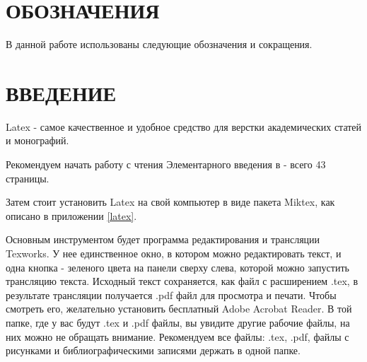 \documentclass[a4paper,14pt,oneside]{book}
\theoremstyle{plain} %
\theoremstyle{definition} %
\theoremstyle{remark} %
\begin{document}




\cleardoublepage               %

\renewcommand\contentsname{Содержание}
\tableofcontents

\cleardoublepage                    %

\setcounter{page}{4}  %

\chapter*{ОБОЗНАЧЕНИЯ}

В данной работе использованы следующие обозначения и сокращения.

\chapter*{ВВЕДЕНИЕ}

 Latex - самое качественное и удобное средство для верстки академических статей и монографий.

Рекомендуем начать работу с чтения Элементарного введения в \cite{__2003} - всего 43 страницы.

Затем стоит установить Latex на свой компьютер  в виде пакета Miktex, как описано в приложении \ref{latex}. 

Основным инструментом будет программа редактирования и трансляции Texworks. У нее единственное окно, в котором можно редактировать текст, и одна кнопка - зеленого цвета на панели сверху слева, которой можно запустить трансляцию текста. Исходный текст сохраняется, как файл с расширением .tex, в результате трансляции получается .pdf файл для просмотра и печати. Чтобы смотреть его, желательно установить бесплатный Adobe Acrobat Reader. В той папке, где у вас будут .tex и .pdf файлы, вы увидите другие рабочие файлы, на них можно не обращать внимание. Рекомендуем все файлы:  .tex, .pdf, файлы с рисунками и библиографическими записями держать в одной папке.
\end{document}
